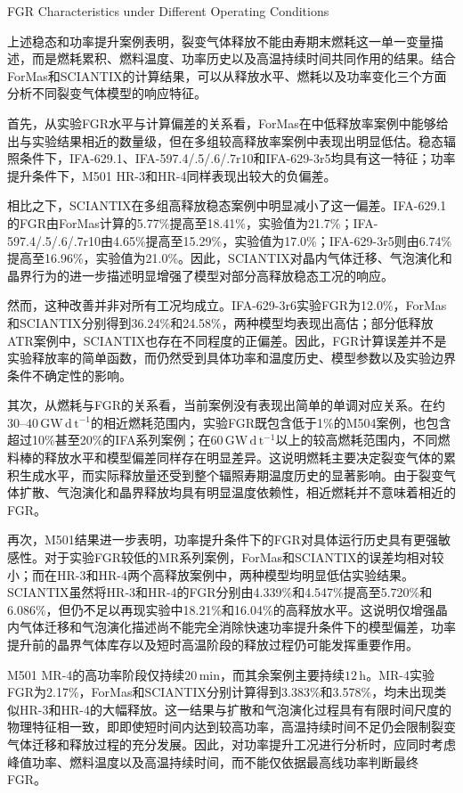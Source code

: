 {FGR Characteristics under Different Operating Conditions}

上述稳态和功率提升案例表明，裂变气体释放不能由寿期末燃耗这一单一变量描述，而是燃耗累积、燃料温度、功率历史以及高温持续时间共同作用的结果。结合ForMas和SCIANTIX的计算结果，可以从释放水平、燃耗以及功率变化三个方面分析不同裂变气体模型的响应特征。

首先，从实验FGR水平与计算偏差的关系看，ForMas在中低释放率案例中能够给出与实验结果相近的数量级，但在多组较高释放率案例中表现出明显低估。稳态辐照条件下，IFA-629.1、IFA-597.4/.5/.6/.7r10和IFA-629-3r5均具有这一特征；功率提升条件下，M501 HR-3和HR-4同样表现出较大的负偏差。

相比之下，SCIANTIX在多组高释放稳态案例中明显减小了这一偏差。IFA-629.1的FGR由ForMas计算的5.77\%提高至18.41\%，实验值为21.7\%；IFA-597.4/.5/.6/.7r10由4.65\%提高至15.29\%，实验值为17.0\%；IFA-629-3r5则由6.74\%提高至16.96\%，实验值为21.0\%。因此，SCIANTIX对晶内气体迁移、气泡演化和晶界行为的进一步描述明显增强了模型对部分高释放稳态工况的响应。

然而，这种改善并非对所有工况均成立。IFA-629-3r6实验FGR为12.0\%，ForMas和SCIANTIX分别得到36.24\%和24.58\%，两种模型均表现出高估；部分低释放ATR案例中，SCIANTIX也存在不同程度的正偏差。因此，FGR计算误差并不是实验释放率的简单函数，而仍然受到具体功率和温度历史、模型参数以及实验边界条件不确定性的影响。

其次，从燃耗与FGR的关系看，当前案例没有表现出简单的单调对应关系。在约$30$--$40\,\mathrm{GW\,d\,t^{-1}}$的相近燃耗范围内，实验FGR既包含低于1\%的M504案例，也包含超过10\%甚至20\%的IFA系列案例；在$60\,\mathrm{GW\,d\,t^{-1}}$以上的较高燃耗范围内，不同燃料棒的释放水平和模型偏差同样存在明显差异。这说明燃耗主要决定裂变气体的累积生成水平，而实际释放量还受到整个辐照寿期温度历史的显著影响。由于裂变气体扩散、气泡演化和晶界释放均具有明显温度依赖性，相近燃耗并不意味着相近的FGR。

再次，M501结果进一步表明，功率提升条件下的FGR对具体运行历史具有更强敏感性。对于实验FGR较低的MR系列案例，ForMas和SCIANTIX的误差均相对较小；而在HR-3和HR-4两个高释放案例中，两种模型均明显低估实验结果。SCIANTIX虽然将HR-3和HR-4的FGR分别由4.339\%和4.547\%提高至5.720\%和6.086\%，但仍不足以再现实验中18.21\%和16.04\%的高释放水平。这说明仅增强晶内气体迁移和气泡演化描述尚不能完全消除快速功率提升条件下的模型偏差，功率提升前的晶界气体库存以及短时高温阶段的释放过程仍可能发挥重要作用。

M501 MR-4的高功率阶段仅持续$20\,\mathrm{min}$，而其余案例主要持续$12\,\mathrm{h}$。MR-4实验FGR为2.17\%，ForMas和SCIANTIX分别计算得到3.383\%和3.578\%，均未出现类似HR-3和HR-4的大幅释放。这一结果与扩散和气泡演化过程具有有限时间尺度的物理特征相一致，即即使短时间内达到较高功率，高温持续时间不足仍会限制裂变气体迁移和释放过程的充分发展。因此，对功率提升工况进行分析时，应同时考虑峰值功率、燃料温度以及高温持续时间，而不能仅依据最高线功率判断最终FGR。

